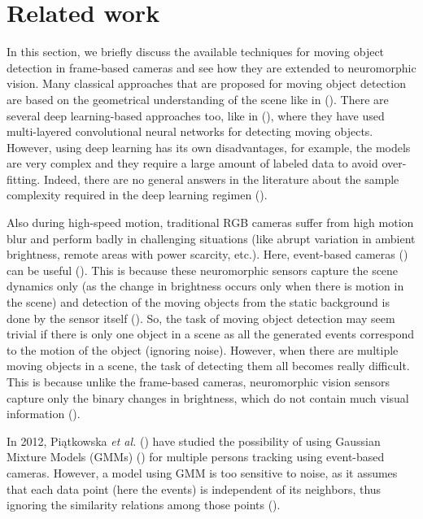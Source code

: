 \documentclass{article}
\begin{document}
\section{Related work}
In this section, we briefly discuss the available techniques for moving object detection in frame-based cameras and see how they are extended to neuromorphic vision. Many classical approaches that are proposed for moving object detection are based on the geometrical understanding of the scene like in (\cite{menze2015object}). There are several deep learning-based approaches too, like in (\cite{huang2019deep,zhu2020moving}), where they have used multi-layered convolutional neural networks for detecting moving objects. However, using deep learning has its own disadvantages, for example, the models are very complex and they require a large amount of labeled data to avoid over-fitting. Indeed, there are no general answers in the literature about the sample complexity required in the deep learning regimen (\cite{giraldo2020graph}).

Also during high-speed motion, traditional RGB cameras suffer from high motion blur and perform badly in challenging situations (like abrupt variation in ambient brightness, remote areas with power scarcity, etc.). Here, event-based cameras (\cite{chen2020event,gallego2020event}) can be useful (\cite{rebecq2019high}). This is because these neuromorphic sensors capture the scene dynamics only (as the change in brightness occurs only when there is motion in the scene) and detection of the moving objects from the static background is done by the sensor itself (\cite{pikatkowska2012spatiotemporal}). So, the task of moving object detection may seem trivial if there is only one object in a scene as all the generated events correspond to the motion of the object (ignoring noise). However, when there are multiple moving objects in a scene, the task of detecting them all becomes really difficult. This is because unlike the frame-based cameras, neuromorphic vision sensors capture only the binary changes in brightness, which do not contain much visual information (\cite{pikatkowska2012spatiotemporal}).

In 2012, Piątkowska \textit{et al.} (\cite{pikatkowska2012spatiotemporal}) have studied the possibility of using Gaussian Mixture Models (GMMs) (\cite{reynolds2009gaussian}) for multiple persons tracking using event-based cameras. However, a model using GMM is too sensitive to noise, as it assumes that each data point (here the events) is independent of its neighbors, thus ignoring the similarity relations among those points (\cite{nguyen2011gaussian}).
 
\end{document}
